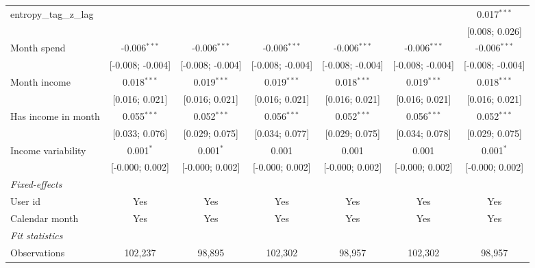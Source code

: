 \begin{table}[htbp]
\begin{threeparttable}[b]
\begin{tabular}{lcccccc}
         entropy\_tag\_z\_lag            &                  &                  &                  &                  &                  & 0.017$^{***}$\\   
                                         &                  &                  &                  &                  &                  & [0.008; 0.026]\\   
         Month spend                     & -0.006$^{***}$   & -0.006$^{***}$   & -0.006$^{***}$   & -0.006$^{***}$   & -0.006$^{***}$   & -0.006$^{***}$\\   
                                         & [-0.008; -0.004] & [-0.008; -0.004] & [-0.008; -0.004] & [-0.008; -0.004] & [-0.008; -0.004] & [-0.008; -0.004]\\   
         Month income                    & 0.018$^{***}$    & 0.019$^{***}$    & 0.019$^{***}$    & 0.018$^{***}$    & 0.019$^{***}$    & 0.018$^{***}$\\   
                                         & [0.016; 0.021]   & [0.016; 0.021]   & [0.016; 0.021]   & [0.016; 0.021]   & [0.016; 0.021]   & [0.016; 0.021]\\   
         Has income in month             & 0.055$^{***}$    & 0.052$^{***}$    & 0.056$^{***}$    & 0.052$^{***}$    & 0.056$^{***}$    & 0.052$^{***}$\\   
                                         & [0.033; 0.076]   & [0.029; 0.075]   & [0.034; 0.077]   & [0.029; 0.075]   & [0.034; 0.078]   & [0.029; 0.075]\\   
         Income variability              & 0.001$^{*}$      & 0.001$^{*}$      & 0.001            & 0.001            & 0.001            & 0.001$^{*}$\\   
                                         & [-0.000; 0.002]  & [-0.000; 0.002]  & [-0.000; 0.002]  & [-0.000; 0.002]  & [-0.000; 0.002]  & [-0.000; 0.002]\\   
         \midrule
         \emph{Fixed-effects}\\
         User id                         & Yes              & Yes              & Yes              & Yes              & Yes              & Yes\\  
         Calendar month                  & Yes              & Yes              & Yes              & Yes              & Yes              & Yes\\  
         \midrule
         \emph{Fit statistics}\\
         Observations                    & 102,237          & 98,895           & 102,302          & 98,957           & 102,302          & 98,957\\  

\end{tabular}
\end{threeparttable}
\end{table}
